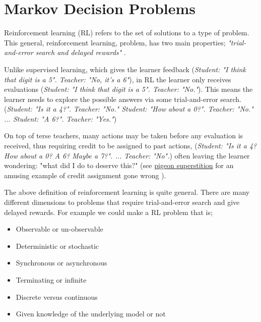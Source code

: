 \chapter{Markov Decision Problems}\label{mdps}

Reinforcement learning (RL) refers to the set of solutions to a type of problem.
This general, reinforcement learning, problem, has two main properties;
\textit{"trial-and-error search and delayed rewards"} \cite{Sutton2018}.

Unlike supervised learning, which gives the learner feedback (\textit{Student: "I think that digit
is a 5". Teacher: "No, it's a 6"}), in RL the learner only receives evaluations (\textit{Student: "I think
that digit is a 5". Teacher: "No."}). This means the learner needs to explore the possible answers via some trial-and-error search.
(\textit{Student: "Is it a 4?". Teacher: "No." Student: "How about a 0?". Teacher: "No." ... Student: "A 6?". Teacher: "Yes."})

On top of terse teachers, many actions may be taken before any evaluation is received, thus requiring credit to be assigned to past actions,
(\textit{Student: "Is it a 4? How about a 0? A 6? Maybe a 7?". ... Teacher: "No".})
often leaving the learner wondering: "what did I do to deserve this?" (see
\href{https://www.youtube.com/watch?v=Qv4H81gEGDQ}{pigeon superstition} for an amusing
example of credit assignment gone wrong \cite{Box1997}).


\vspace{5mm}

The above definition of reinforcement learning is quite general. There are many
different dimensions to problems that require trial-and-error search and give
delayed rewards. For example we could make a RL problem that is;

\begin{itemize}
\tightlist
\item
  Observable or un-observable \cite{Kaelbling1998}
\item
  Deterministic or stochastic \cite{Putterman2015}
\item
  Synchronous or asynchronous \cite{Bertsekas1995}
\item
  Terminating or infinite \cite{Putterman2015}
\item
  Discrete versus continuous \cite{Bertsekas1995}
\item
  Given knowledge of the underlying model or not \cite{Sutton1991}
\end{itemize}

